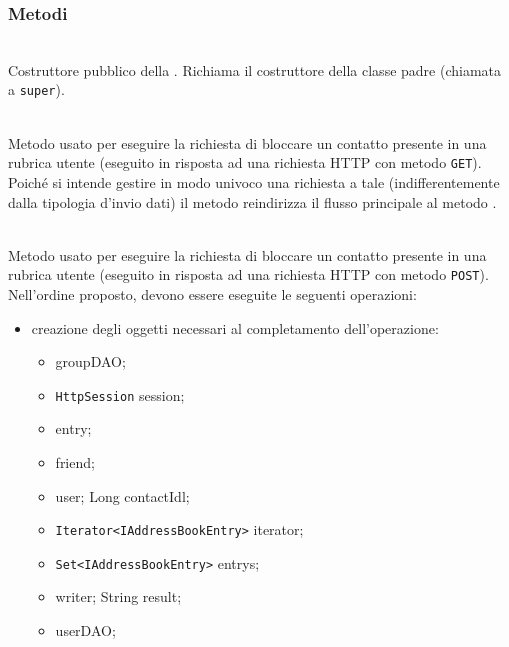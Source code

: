\subsubsection*{Metodi}

\begin{description}
	\item{}\\
	Costruttore pubblico della . Richiama il costruttore della classe padre (chiamata a \texttt{super}).
	
	\item{}\\
	Metodo usato per eseguire la richiesta di bloccare un contatto presente in una rubrica utente (eseguito in risposta ad una richiesta HTTP con metodo \texttt{GET}). Poiché si intende gestire in modo univoco una richiesta a tale  (indifferentemente dalla tipologia d'invio dati) il metodo reindirizza il flusso principale al metodo .
	
	\item{}\\	
	Metodo usato per eseguire la richiesta di bloccare un contatto presente in una rubrica utente (eseguito in risposta ad una richiesta HTTP con metodo \texttt{POST}). Nell'ordine proposto, devono essere eseguite le seguenti operazioni:
	\begin{itemize}
		\item creazione degli oggetti necessari al completamento dell'operazione:
		\begin{itemize}
			\item {} groupDAO;
			\item \texttt{HttpSession} session;
			\item {} entry;
			\item {} friend;
			\item {} user;
			Long contactIdl;
			\item \texttt{Iterator<IAddressBookEntry>} iterator;
			\item \texttt{Set<IAddressBookEntry>} entrys;
			\item {} writer;
			String result;
			\item {} userDAO;
		\end{itemize}
		

\end{itemize}
\end{description}
